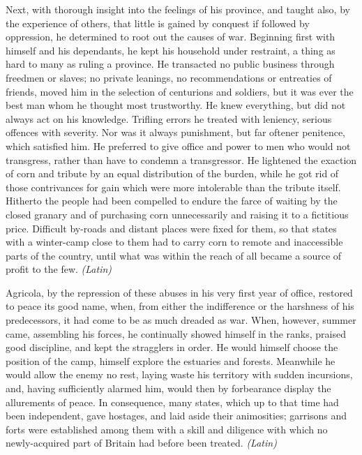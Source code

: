 
Next, with thorough insight into the feelings of his province, and taught also, by the experience of others, that little is gained by conquest if followed by oppression, he determined to root out the causes of war. Beginning first with himself and his dependants, he kept his household under restraint, a thing as hard to many as ruling a province. He transacted no public business through freedmen or slaves; no private leanings, no recommendations or entreaties of friends, moved him in the selection of centurions and soldiers, but it was ever the best man whom he thought most trustworthy. He knew everything, but did not always act on his knowledge. Trifling errors he treated with leniency, serious offences with severity. Nor was it always punishment, but far oftener penitence, which satisfied him. He preferred to give office and power to men who would not transgress, rather than have to condemn a transgressor. He lightened the exaction of corn and tribute by an equal distribution of the burden, while he got rid of those contrivances for gain which were more intolerable than the tribute itself. Hitherto the people had been compelled to endure the farce of waiting by the closed granary and of purchasing corn unnecessarily and raising it to a fictitious price. Difficult by-roads and distant places were fixed for them, so that states with a winter-camp close to them had to carry corn to remote and inaccessible parts of the country, until what was within the reach of all became a source of profit to the few. \emph{(Latin)}


Agricola, by the repression of these abuses in his very first year of office, restored to peace its good name, when, from either the indifference or the harshness of his predecessors, it had come to be as much dreaded as war. When, however, summer came, assembling his forces, he continually showed himself in the ranks, praised good discipline, and kept the stragglers in order. He would himself choose the position of the camp, himself explore the estuaries and forests. Meanwhile he would allow the enemy no rest, laying waste his territory with sudden incursions, and, having sufficiently alarmed him, would then by forbearance display the allurements of peace. In consequence, many states, which up to that time had been independent, gave hostages, and laid aside their animosities; garrisons and forts were established among them with a skill and diligence with which no newly-acquired part of Britain had before been treated. \emph{(Latin)}

